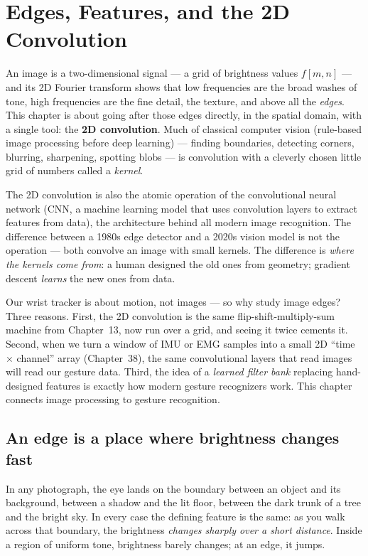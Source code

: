 \chapter{Edges, Features, and the 2D Convolution}

An image is a two-dimensional
signal --- a grid of brightness values $f[m,n]$ --- and its
2D Fourier transform shows that low frequencies are the broad washes of
tone, high frequencies are the fine detail, the texture, and above all the
\emph{edges}. This chapter is about going after those edges directly, in the
spatial domain, with a single tool: the \textbf{2D convolution}. Much of classical computer vision (rule-based image processing before deep learning) --- finding boundaries, detecting
corners, blurring, sharpening, spotting blobs --- is convolution with a
cleverly chosen little grid of numbers called a \emph{kernel}.

The 2D convolution is also the atomic operation of the convolutional neural
network (CNN, a machine learning model that uses convolution layers to extract features from data), the architecture behind all modern image
recognition. The difference between a 1980s edge detector and a 2020s vision
model is not the operation --- both convolve an image with small kernels. The
difference is \emph{where the kernels come from}: a human designed the old
ones from geometry; gradient descent \emph{learns} the new ones from data. 
\begin{goalbox}
Our wrist tracker is about motion, not images --- so why study image edges?
Three reasons. First, the 2D convolution is the same flip-shift-multiply-sum
machine from Chapter~13, now run over a grid, and seeing it twice cements it.
Second, when we turn a window of IMU or EMG samples into a small 2D
``time $\times$ channel'' array (Chapter~38), the same convolutional
layers that read images will read our gesture data. Third, the idea of a
\emph{learned filter bank} replacing hand-designed features is exactly how
modern gesture recognizers work. This chapter connects image processing to
gesture recognition.
\end{goalbox}

\chapterline

\section{An edge is a place where brightness changes fast}
\label{ch32:what-is-an-edge}

In any photograph, the eye lands on the
boundary between an object and its background, between a shadow and the lit
floor, between the dark trunk of a tree and the bright sky. In every case the
defining feature is the same: as you walk across that boundary, the brightness
\emph{changes sharply over a short distance}. Inside a region of uniform tone,
brightness barely changes; at an edge, it jumps.

